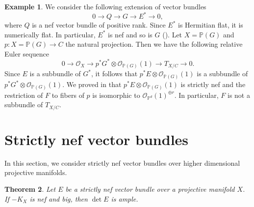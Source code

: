 \documentclass[english,reqno]{amsart}
\newcommand\bbP{{\mathbb P}}
\newcommand\sO{{\mathscr O}}
\theoremstyle{plain}
\newtheorem{thm}{Theorem}[section]
\theoremstyle{definition}
\newtheorem{example}[thm]{Example}
\numberwithin{equation}{section} %
\begin{document}
\begin{example}
    We consider the following extension of vector bundles
    \[0\rightarrow Q\rightarrow G\rightarrow E^*\rightarrow 0,\]
    where $Q$ is a nef vector bundle of positive rank.    Since $E^*$ is Hermitian flat, it is numerically flat. In particular, $E^*$ is nef and so is $G$ (\cite[Proposition 1.15]{DemaillyPeternellSchneider1994}).
    Let $X=\bbP(G)$ and  $p: X= \bbP(G)\rightarrow C$ the natural projection. Then we have the following relative Euler sequence
    \[0\rightarrow \sO_X\rightarrow p^*G^*\otimes\sO_{\bbP(G)}(1)\rightarrow T_{X/C}\rightarrow 0.\]
    Since $E$ is a subbundle of $G^*$, it follows that
    $ p^*E\otimes \sO_{\bbP(G)}(1)$ is a subbundle of $p^*G^*\otimes \sO_{\bbP(G)}(1)$.
    We proved in \cite[Example~5.10]{LiuOuYang2020} that  $ p^*E\otimes \sO_{\bbP(G)}(1)$ is strictly nef and  the restriction of $F$ to fibers of $p$ is isomorphic to $\sO_{\bbP^d}(1)^{\oplus r}$. In particular,  $F$ is not a subbundle of $T_{X/C}$.
\end{example}












\baselineskip


















\section{Strictly nef vector bundles}

 In this section, we consider strictly nef vector bundles over  higher dimensional projective manifolds.




\begin{thm} Let $E$ be a strictly nef vector bundle over a projective manifold $X$.   If $-K_X$ is nef and big, then $\det E$ is ample.
\end{thm}
\end{document}

